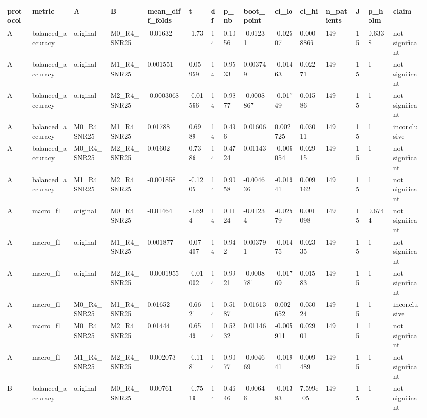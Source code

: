 \begin{tabular}{lllllllllllllll}
\hline
protocol & metric & A & B & mean\_diff\_folds & t & df & p\_nb & boot\_point & ci\_lo & ci\_hi & n\_patients & J & p\_holm & claim \\
\hline
A & balanced\_accuracy & original & M0\_R4\_SNR25 & -0.01632 & -1.73 & 14 & 0.1056 & -0.01231 & -0.02507 & 0.0008866 & 149 & 15 & 0.6338 & not significant \\
A & balanced\_accuracy & original & M1\_R4\_SNR25 & 0.001551 & 0.05959 & 14 & 0.9533 & 0.003749 & -0.01463 & 0.02271 & 149 & 15 & 1 & not significant \\
A & balanced\_accuracy & original & M2\_R4\_SNR25 & -0.0003068 & -0.01566 & 14 & 0.9877 & -0.0008867 & -0.01749 & 0.01586 & 149 & 15 & 1 & not significant \\
A & balanced\_accuracy & M0\_R4\_SNR25 & M1\_R4\_SNR25 & 0.01788 & 0.6989 & 14 & 0.496 & 0.01606 & 0.002725 & 0.03011 & 149 & 15 & 1 & inconclusive \\
A & balanced\_accuracy & M0\_R4\_SNR25 & M2\_R4\_SNR25 & 0.01602 & 0.7386 & 14 & 0.4724 & 0.01143 & -0.006054 & 0.02915 & 149 & 15 & 1 & not significant \\
A & balanced\_accuracy & M1\_R4\_SNR25 & M2\_R4\_SNR25 & -0.001858 & -0.1205 & 14 & 0.9058 & -0.004636 & -0.01941 & 0.009162 & 149 & 15 & 1 & not significant \\
A & macro\_f1 & original & M0\_R4\_SNR25 & -0.01464 & -1.694 & 14 & 0.1124 & -0.01234 & -0.02579 & 0.001098 & 149 & 15 & 0.6744 & not significant \\
A & macro\_f1 & original & M1\_R4\_SNR25 & 0.001877 & 0.07407 & 14 & 0.942 & 0.003791 & -0.01475 & 0.02335 & 149 & 15 & 1 & not significant \\
A & macro\_f1 & original & M2\_R4\_SNR25 & -0.0001955 & -0.01002 & 14 & 0.9921 & -0.0008781 & -0.01769 & 0.01583 & 149 & 15 & 1 & not significant \\
A & macro\_f1 & M0\_R4\_SNR25 & M1\_R4\_SNR25 & 0.01652 & 0.6621 & 14 & 0.5187 & 0.01613 & 0.002652 & 0.03024 & 149 & 15 & 1 & inconclusive \\
A & macro\_f1 & M0\_R4\_SNR25 & M2\_R4\_SNR25 & 0.01444 & 0.6549 & 14 & 0.5232 & 0.01146 & -0.005911 & 0.02901 & 149 & 15 & 1 & not significant \\
A & macro\_f1 & M1\_R4\_SNR25 & M2\_R4\_SNR25 & -0.002073 & -0.1181 & 14 & 0.9077 & -0.004669 & -0.01941 & 0.009489 & 149 & 15 & 1 & not significant \\
B & balanced\_accuracy & original & M0\_R4\_SNR25 & -0.00761 & -0.7519 & 14 & 0.4646 & -0.00646 & -0.01383 & 7.599e-05 & 149 & 15 & 1 & not significant \\

\end{tabular}
